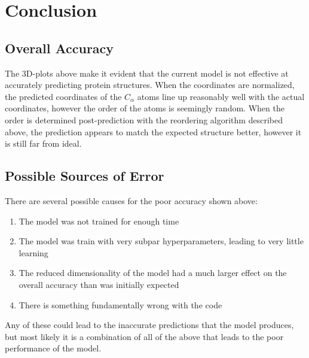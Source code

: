 \documentclass[11pt]{article}
\begin{document}
\section{Conclusion}
\subsection{Overall Accuracy}
The 3D-plots above make it evident that the current model is not effective at accurately predicting protein structures.  When the coordinates are normalized, the predicted coordinates of the $C_{\alpha}$ atoms line up reasonably well with the actual coordinates, however the order of the atoms is seemingly random.  When the order is determined post-prediction with the reordering algorithm described above, the prediction appears to match the expected structure better, however it is still far from ideal.

\subsection{Possible Sources of Error}
There are several possible causes for the poor accuracy shown above:
\begin{enumerate}[label=(\alph*)]
	\item The model was not trained for enough time
	\item The model was train with very subpar hyperparameters, leading to very little learning
	\item The reduced dimensionality of the model had a much larger effect on the overall accuracy than was initially expected
	\item There is something fundamentally wrong with the code
\end{enumerate}
Any of these could lead to the inaccurate predictions that the model produces, but most likely it is a combination of all of the above that leads to the poor performance of the model.
\end{document}
